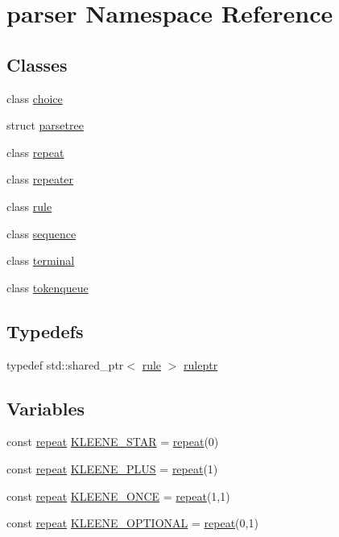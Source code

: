 \hypertarget{namespaceparser}{}\section{parser Namespace Reference}
\label{namespaceparser}
\subsection*{Classes}
\begin{DoxyCompactItemize}
\item 
class \hyperlink{classparser_1_1choice}{choice}
\item 
struct \hyperlink{structparser_1_1parsetree}{parsetree}
\item 
class \hyperlink{classparser_1_1repeat}{repeat}
\item 
class \hyperlink{classparser_1_1repeater}{repeater}
\item 
class \hyperlink{classparser_1_1rule}{rule}
\item 
class \hyperlink{classparser_1_1sequence}{sequence}
\item 
class \hyperlink{classparser_1_1terminal}{terminal}
\item 
class \hyperlink{classparser_1_1tokenqueue}{tokenqueue}
\end{DoxyCompactItemize}
\subsection*{Typedefs}
\begin{DoxyCompactItemize}
\item 
typedef std\+::shared\+\_\+ptr$<$ \hyperlink{classparser_1_1rule}{rule} $>$ \hyperlink{namespaceparser_a85b2df48287fddaca144a5f6c01b4761}{ruleptr}
\end{DoxyCompactItemize}
\subsection*{Variables}
\begin{DoxyCompactItemize}
\item 
const \hyperlink{classparser_1_1repeat}{repeat} \hyperlink{namespaceparser_ac46e69b1e6ac0db5fa1b987e69e0c64e}{K\+L\+E\+E\+N\+E\+\_\+\+S\+T\+AR} = \hyperlink{classparser_1_1repeat}{repeat}(0)
\item 
const \hyperlink{classparser_1_1repeat}{repeat} \hyperlink{namespaceparser_a97ed17cb3337d680cb84ca3f2af8c2dd}{K\+L\+E\+E\+N\+E\+\_\+\+P\+L\+US} = \hyperlink{classparser_1_1repeat}{repeat}(1)
\item 
const \hyperlink{classparser_1_1repeat}{repeat} \hyperlink{namespaceparser_a1856f1b1a3996f6388d8686cf35daff9}{K\+L\+E\+E\+N\+E\+\_\+\+O\+N\+CE} = \hyperlink{classparser_1_1repeat}{repeat}(1,1)
\item 
const \hyperlink{classparser_1_1repeat}{repeat} \hyperlink{namespaceparser_ac97f2803cfa3a6e9328865ea4744d4d6}{K\+L\+E\+E\+N\+E\+\_\+\+O\+P\+T\+I\+O\+N\+AL} = \hyperlink{classparser_1_1repeat}{repeat}(0,1)
\end{DoxyCompactItemize}


